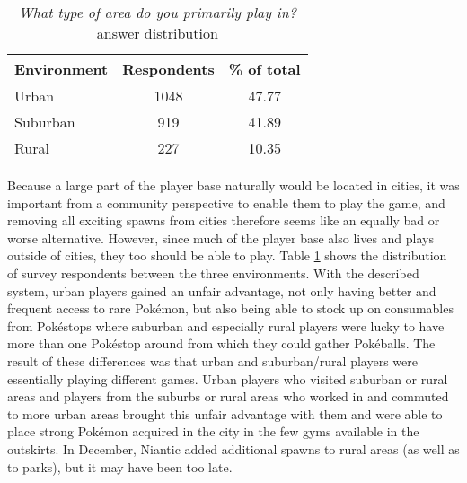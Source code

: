 
\begin{table}[h]
	\centering
	\begin{tabular}{|l|c|c|}
		\hline
		\textbf{Environment} & \textbf{Respondents} & \textbf{\% of total}\\\hline\hline
		Urban & 1048 & 47.77\\\hline
		Suburban & 919 & 41.89\\\hline
		Rural & 227 & 10.35\\\hline
	\end{tabular}
	\caption{\emph{What type of area do you primarily play in?} answer distribution}
	\label{tbl:urban-level-distribution}
\end{table}

Because a large part of the player base naturally would be located in cities, it was important from a community perspective to enable them to play the game, and removing all exciting spawns from cities therefore seems like an equally bad or worse alternative. However, since much of the player base also lives and plays outside of cities, they too should be able to play. Table \ref{tbl:urban-level-distribution} shows the distribution of survey respondents between the three environments. With the described system, urban players gained an unfair advantage, not only having better and frequent access to rare Pokémon, but also being able to stock up on consumables from Pokéstops where suburban and especially rural players were lucky to have more than one Pokéstop around from which they could gather Pokéballs. The result of these differences was that urban and suburban/rural players were essentially playing different games. Urban players who visited suburban or rural areas and players from the suburbs or rural areas who worked in and commuted to more urban areas brought this unfair advantage with them and were able to place strong Pokémon acquired in the city in the few gyms available in the outskirts. In December, Niantic added additional spawns to rural areas (as well as to parks), but it may have been too late. 

